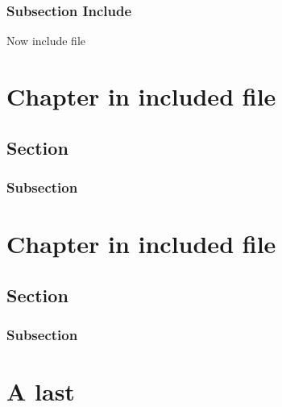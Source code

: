 \documentclass{book}
\newcommand{\Texinfotheinclude}{}%
\renewcommand{\_}{\Texinfounderscore\discretionary{}{}{}}
\begin{document}
\subsection{{Subsection Include}}


Now include file
\renewcommand{\Texinfotheinclude}{section\_file\_no\_node.texi}%


\chapter{{Chapter in included file}}

\section{{Section}}

\subsection{{Subsection}}

\renewcommand{\Texinfotheinclude}{section\_file\_no\_node\_include.texi}%

\renewcommand{\Texinfotheinclude}{}%

\renewcommand{\Texinfotheinclude}{section\_file\_no\_node.texi}%


\chapter{{Chapter in included file}}

\section{{Section}}

\subsection{{Subsection}}

\renewcommand{\Texinfotheinclude}{}%


\chapter{{A last}}
\label{anchor:last-chap}%
\end{document}
